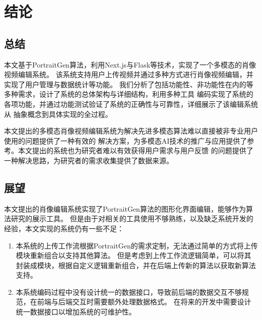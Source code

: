 \chapter{结论}

\section{总结}

本文基于PortraitGen算法，利用Next.js与Flask等技术，实现了一个多模态的肖像视频编辑系统。
该系统支持用户上传视频并通过多种方式进行肖像视频编辑，并实现了用户管理与数据统计等功能。
我们分析了包括功能性、非功能性在内的等多种需求，设计了系统的总体架构与详细结构，利用多种工具
编码实现了系统的各项功能，并通过功能测试验证了系统的正确性与可靠性，详细展示了该编辑系统从
抽象概念到具体实现的全过程。

本文提出的多模态肖像视频编辑系统为解决先进多模态算法难以直接被非专业用户使用的问题提供了一种有效的
解决方案，为多模态AI技术的推广与应用提供了参考。本文提出的系统也为研究者难以有效获得用户需求与用户反馈
的问题提供了一种解决思路，为研究者的需求收集提供了数据来源。

\section{展望}

本文提出的肖像编辑系统实现了PortraitGen算法的图形化界面编辑，能够作为算法研究的展示工具。
但是由于对相关的工具使用不够熟练，以及缺乏系统开发的经验，本文实现的系统仍有一些不足：
\begin{enumerate}
    \item 本系统的上传工作流根据PortraitGen的需求定制，无法通过简单的方式将上传模块重新组合以支持其他算法。
    但是考虑到上传工作流逻辑简单，可以将其封装成模块，根据自定义逻辑重新组合，并在后端上传新的算法以获取新算法支持。
    \item 本系统编码过程中没有设计统一的数据接口，导致前后端的数据交互不够规范，在前端与后端交互时需要额外处理数据格式。
    在将来的开发中需要设计统一数据接口以增加系统的可维护性。
\end{enumerate}